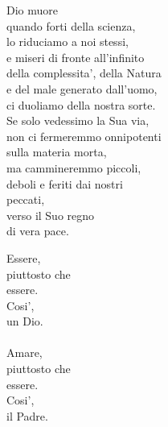 \begin{haiku}
    Dio muore\\
    quando forti della scienza,\\
    lo riduciamo a noi stessi,\\
    e miseri di fronte all'infinito\\
    della complessita', della Natura\\
    e del male generato dall'uomo,\\
    ci duoliamo della nostra sorte.\\
    Se solo vedessimo la Sua via,\\
    non ci fermeremmo onnipotenti\\
    sulla materia morta,\\
    ma cammineremmo piccoli,\\
    deboli e feriti dai nostri\\
    peccati,\\
    verso il Suo regno\\
    di vera pace.\\
\end{haiku}


\begin{haiku}
    Essere,\\
    piuttosto che\\
    essere.\\
    Cosi',\\
    un Dio.\\
    \leavevmode\\
    Amare,\\
    piuttosto che\\
    essere.\\
    Cosi',\\
    il Padre.\\

\end{haiku}


